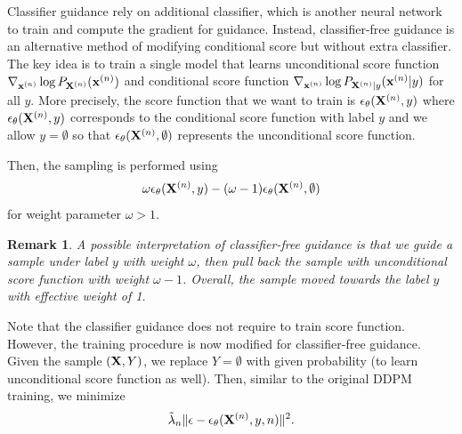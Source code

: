\documentclass[11pt, a4paper]{article}
\newtheorem{remark}{Remark}
\begin{document}
Classifier guidance rely on additional classifier, which is another neural network to train and compute the gradient for guidance.
Instead, classifier-free guidance is an alternative method of modifying conditional score but without extra classifier.
The key idea is to train a single model that learns unconditional score function $\nabla_{{\bf x}^{(n)}} \log P_{{\bf X}^{(n)}}({\bf x}^{(n)})$ and
conditional score function $\nabla_{{\bf x}^{(n)}} \log P_{{\bf X}^{(n)}|y}({\bf x}^{(n)}|y)$ for all $y$.
More precisely, the score function that we want to train is $\epsilon_\theta({\bf X}^{(n)}, y)$ where
$\epsilon_\theta({\bf X}^{(n)}, y)$ corresponds to the conditional score function with label $y$
and we allow $y=\emptyset$ so that $\epsilon_\theta({\bf X}^{(n)}, \emptyset)$ represents the unconditional score function.

Then, the sampling is performed using
\begin{align}
    \omega \epsilon_{\theta}({\bf X}^{(n)}, y) -  (\omega-1) \epsilon_{\theta}({\bf X}^{(n)}, \emptyset) 
\end{align}
for weight parameter $\omega > 1$.
\begin{remark}
    A possible interpretation of classifier-free guidance is that we guide a sample under label $y$ with weight $\omega$,
    then pull back the sample with unconditional score function with weight $\omega-1$.
    Overall, the sample moved towards the label $y$ with effective weight of 1.
\end{remark}

Note that the classifier guidance does not require to train score function.
However, the training procedure is now modified for classifier-free guidance.
Given the sample $({\bf X}, Y)$, we replace $Y=\emptyset$ with given probability (to learn unconditional score function as well).
Then, similar to the original DDPM training, we minimize
\begin{align}
     \tilde{\lambda}_n \| \epsilon - \epsilon_{\theta}({\bf X}^{(n)}, y, n)\|^2.
\end{align}



{\small


% 
}
\end{document}
